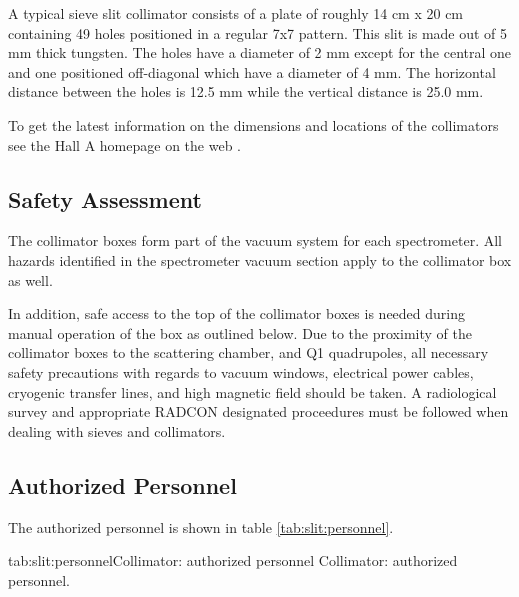 A typical sieve slit collimator 
consists of a plate of roughly 14 cm x 20 cm containing 49 holes
positioned in a regular 7x7 pattern. This slit is made out of 5
mm thick tungsten.
The holes have a diameter of 2 mm except for the central one and one positioned
off-diagonal which have a diameter of 4 mm. The horizontal distance between the
holes is 12.5 mm while the vertical distance is 25.0 mm.

To get the latest information on the dimensions and locations of the collimators see 
the Hall A homepage on the web%
.

\begin{safetyen}{10}{15}
\subsection{Safety Assessment}

The collimator boxes form part of the vacuum system for each spectrometer. All hazards
identified in the spectrometer vacuum section apply to the collimator box as well.

In addition, safe access to the top of
the collimator boxes is needed  during manual operation of the box as outlined below.
Due to the proximity of the collimator boxes to the scattering chamber, and Q1 quadrupoles,
all necessary safety precautions with regards to vacuum windows, electrical power cables, 
cryogenic transfer lines, and high magnetic field should be taken. A radiological survey and
appropriate RADCON designated proceedures must be followed when dealing with sieves 
and collimators.
\end{safetyen}


\begin{safetyen}{10}{15}
\subsection{Authorized  Personnel} 
\end{safetyen}
The authorized personnel is shown in table \ref{tab:slit:personnel}.
\begin{namestab}{tab:slit:personnel}{Collimator: authorized personnel}{%
      Collimator: authorized personnel.}
\end{namestab}

